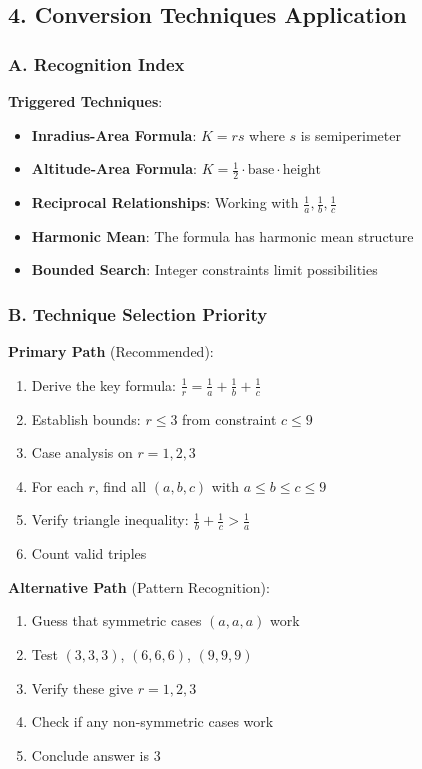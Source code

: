 \documentclass[12pt]{article}
\begin{document}
\begin{techniquesbox}
\subsection*{4. Conversion Techniques Application}

\subsubsection*{A. Recognition Index}

\textbf{Triggered Techniques}:
\begin{itemize}
    \item \textbf{Inradius-Area Formula}: $K = rs$ where $s$ is semiperimeter
    \item \textbf{Altitude-Area Formula}: $K = \frac{1}{2} \cdot \text{base} \cdot \text{height}$
    \item \textbf{Reciprocal Relationships}: Working with $\frac{1}{a}, \frac{1}{b}, \frac{1}{c}$
    \item \textbf{Harmonic Mean}: The formula has harmonic mean structure
    \item \textbf{Bounded Search}: Integer constraints limit possibilities
\end{itemize}

\subsubsection*{B. Technique Selection Priority}

\textbf{Primary Path} (Recommended):
\begin{enumerate}
    \item Derive the key formula: $\frac{1}{r} = \frac{1}{a} + \frac{1}{b} + \frac{1}{c}$
    \item Establish bounds: $r \leq 3$ from constraint $c \leq 9$
    \item Case analysis on $r = 1, 2, 3$
    \item For each $r$, find all $(a, b, c)$ with $a \leq b \leq c \leq 9$
    \item Verify triangle inequality: $\frac{1}{b} + \frac{1}{c} > \frac{1}{a}$
    \item Count valid triples
\end{enumerate}

\textbf{Alternative Path} (Pattern Recognition):
\begin{enumerate}
    \item Guess that symmetric cases $(a, a, a)$ work
    \item Test $(3, 3, 3)$, $(6, 6, 6)$, $(9, 9, 9)$
    \item Verify these give $r = 1, 2, 3$
    \item Check if any non-symmetric cases work
    \item Conclude answer is 3
\end{enumerate}


\end{techniquesbox}
\end{document}
